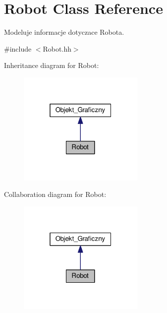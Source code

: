 \hypertarget{class_robot}{\section{Robot Class Reference}
\label{class_robot}
}


Modeluje informacje dotyczace Robota.  




{\ttfamily \#include $<$Robot.\+hh$>$}



Inheritance diagram for Robot\+:\nopagebreak
\begin{figure}[H]
\begin{center}
\leavevmode
\includegraphics[width=172pt]{class_robot__inherit__graph}
\end{center}
\end{figure}


Collaboration diagram for Robot\+:\nopagebreak
\begin{figure}[H]
\begin{center}
\leavevmode
\includegraphics[width=172pt]{class_robot__coll__graph}
\end{center}
\end{figure}
